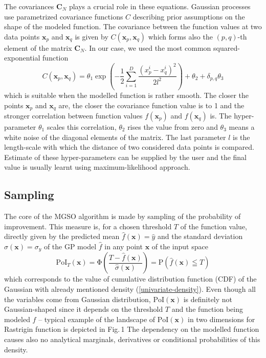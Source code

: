 \documentclass{itatnew}
\newcommand{\xx}{\mathrm{\mathbf{x}}}
\newcommand{\CC}{\mathrm{\mathbf{C}}}
\begin{document}
The covariances $\CC_N$ plays a crucial role in these equations. Gaussian processes use parametrized covariance functions $C$ describing prior assumptions on the shape of the modeled function. The covariance between the function values at two data points $\xx_p$ and $\xx_q$ is given by $C(\xx_p, \xx_q)$ which forms also the $(p,q)$-th element of the matrix $\CC_N$. In our case, we used the most common squared-exponential function
\begin{equation}
C(\xx_p, \xx_q) = \theta_1 \exp \left( -\frac{1}{2} \sum^D_{i=1} \frac{(x^i_p - x^i_q)^2} {2l^2} \right) + \theta_2 + \delta_{p,q}\theta_3
\end{equation}
which is suitable when the modelled function is rather smooth. The closer the points $\xx_p$ and $\xx_q$ are, the closer the covariance function value is to 1 and the stronger correlation between function values $f(\xx_p)$ and $f(\xx_q)$ is. The hyper-parameter $\theta_1$ scales this correlation, $\theta_2$ rises the value from zero and $\theta_3$ means a white noise of the diagonal elements of the matrix. The last parameter $l$ is the length-scale with which the distance of two considered data points is compared. Estimate of these hyper-parameters can be supplied by the user and the final value is usually learnt using maximum-likelihood approach.


\subsection{Sampling}

The core of the MGSO algorithm is made by sampling of the probability of improvement. This measure is, for a chosen threshold $T$ of the function value, directly given by the predicted mean $\hat{f}(\xx) = \hat{y}$ and the standard deviation $\hat{\sigma}(\xx) = \sigma_{y}$ of the GP model $\hat{f}$ in any point $\xx$ of the input space
\begin{equation}
  \mathrm{PoI}_T(\xx) = \mathrm{\Phi}\left( \frac{T - \hat{f}(\xx)}{\hat{\sigma}(\xx)} \right) = \mathrm{P}(\hat{f}(\xx) \leqq T)
\end{equation}
which corresponds to the value of cumulative distribution function (CDF) of the Gaussian with already mentioned density (\ref{univariate-density}). Even though all the variables come from Gaussian distribution, $\mathrm{PoI}(\xx)$ is definitely not Gaussian-shaped since it depends on the threshold $T$ and the function being modeled $f$ -- typical example of the landscape of $\textrm{PoI}(\xx)$ in two dimensions for Rastrigin function is depicted in Fig.\,1 %
The dependency on the modelled function causes also no analytical marginals, derivatives or conditional probabilities of this density.
\end{document}
